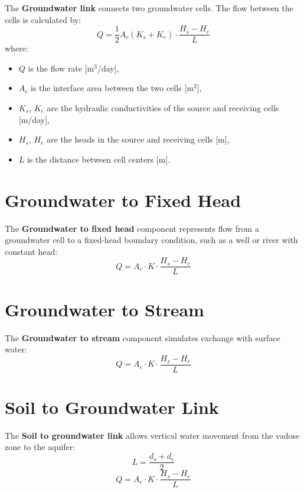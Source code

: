 \documentclass[12pt]{report}
\begin{document}
The \textbf{Groundwater link} connects two groundwater cells. The flow between the cells is calculated by:
\begin{equation}
Q = \frac{1}{2} A_c (K_{s} + K_{e}) \cdot \frac{H_s - H_e}{L}
\end{equation}
where:
\begin{itemize}
  \item $Q$ is the flow rate [m$^3$/day],
  \item $A_c$ is the interface area between the two cells [m$^2$],
  \item $K_s$, $K_e$ are the hydraulic conductivities of the source and receiving cells [m/day],
  \item $H_s$, $H_e$ are the heads in the source and receiving cells [m],
  \item $L$ is the distance between cell centers [m].
\end{itemize}

\section{Groundwater to Fixed Head}

The \textbf{Groundwater to fixed head} component represents flow from a groundwater cell to a fixed-head boundary condition, such as a well or river with constant head:
\begin{equation}
Q = A_c \cdot K \cdot \frac{H_s - H_e}{L}
\end{equation}

\section{Groundwater to Stream}

The \textbf{Groundwater to stream} component simulates exchange with surface water:
\begin{equation}
Q = A_c \cdot K \cdot \frac{H_s - H_e}{L}
\end{equation}

\section{Soil to Groundwater Link}

The \textbf{Soil to groundwater link} allows vertical water movement from the vadose zone to the aquifer:
\begin{equation}
L = \frac{d_s + d_e}{2}
\end{equation}
\begin{equation}
Q = A_c \cdot K \cdot \frac{H_s - H_e}{L}
\end{equation}
\end{document}
